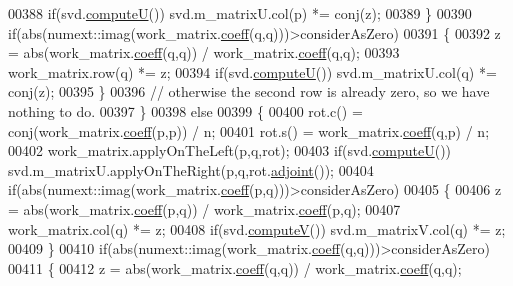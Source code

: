 \begin{DoxyCode}
00388         \textcolor{keywordflow}{if}(svd.\hyperlink{group___s_v_d___module_a705a7c2709e1624ccc19aa748a78d473}{computeU}()) svd.m\_matrixU.col(p) *= conj(z);
00389       \}
00390       \textcolor{keywordflow}{if}(abs(numext::imag(work\_matrix.\hyperlink{class_eigen_1_1_plain_object_base_afbfc12954f16d21aedb7bd839f64a278}{coeff}(q,q)))>considerAsZero)
00391       \{
00392         z = abs(work\_matrix.\hyperlink{class_eigen_1_1_plain_object_base_afbfc12954f16d21aedb7bd839f64a278}{coeff}(q,q)) / work\_matrix.\hyperlink{class_eigen_1_1_plain_object_base_afbfc12954f16d21aedb7bd839f64a278}{coeff}(q,q);
00393         work\_matrix.row(q) *= z;
00394         \textcolor{keywordflow}{if}(svd.\hyperlink{group___s_v_d___module_a705a7c2709e1624ccc19aa748a78d473}{computeU}()) svd.m\_matrixU.col(q) *= conj(z);
00395       \}
00396       \textcolor{comment}{// otherwise the second row is already zero, so we have nothing to do.}
00397     \}
00398     \textcolor{keywordflow}{else}
00399     \{
00400       rot.c() = conj(work\_matrix.\hyperlink{class_eigen_1_1_plain_object_base_afbfc12954f16d21aedb7bd839f64a278}{coeff}(p,p)) / n;
00401       rot.s() = work\_matrix.\hyperlink{class_eigen_1_1_plain_object_base_afbfc12954f16d21aedb7bd839f64a278}{coeff}(q,p) / n;
00402       work\_matrix.applyOnTheLeft(p,q,rot);
00403       \textcolor{keywordflow}{if}(svd.\hyperlink{group___s_v_d___module_a705a7c2709e1624ccc19aa748a78d473}{computeU}()) svd.m\_matrixU.applyOnTheRight(p,q,rot.\hyperlink{group___jacobi___module_a89c8ea615f8fa77ddd5810a1e5fde4da}{adjoint}());
00404       \textcolor{keywordflow}{if}(abs(numext::imag(work\_matrix.\hyperlink{class_eigen_1_1_plain_object_base_afbfc12954f16d21aedb7bd839f64a278}{coeff}(p,q)))>considerAsZero)
00405       \{
00406         z = abs(work\_matrix.\hyperlink{class_eigen_1_1_plain_object_base_afbfc12954f16d21aedb7bd839f64a278}{coeff}(p,q)) / work\_matrix.\hyperlink{class_eigen_1_1_plain_object_base_afbfc12954f16d21aedb7bd839f64a278}{coeff}(p,q);
00407         work\_matrix.col(q) *= z;
00408         \textcolor{keywordflow}{if}(svd.\hyperlink{group___s_v_d___module_a5f12efcb791eb007d4a4890ac5255ac4}{computeV}()) svd.m\_matrixV.col(q) *= z;
00409       \}
00410       \textcolor{keywordflow}{if}(abs(numext::imag(work\_matrix.\hyperlink{class_eigen_1_1_plain_object_base_afbfc12954f16d21aedb7bd839f64a278}{coeff}(q,q)))>considerAsZero)
00411       \{
00412         z = abs(work\_matrix.\hyperlink{class_eigen_1_1_plain_object_base_afbfc12954f16d21aedb7bd839f64a278}{coeff}(q,q)) / work\_matrix.\hyperlink{class_eigen_1_1_plain_object_base_afbfc12954f16d21aedb7bd839f64a278}{coeff}(q,q);

\end{DoxyCode}
